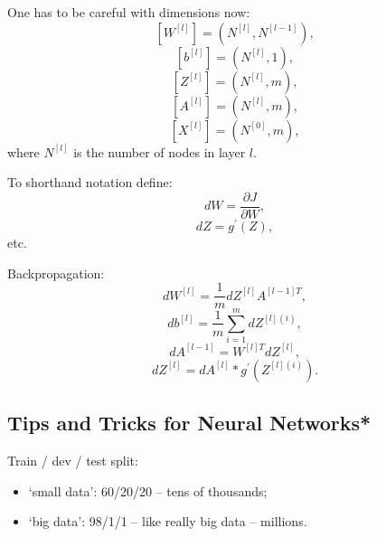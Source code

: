 \documentclass[a4paper,11pt]{article}
\begin{document}
One has to be careful with dimensions now:
\begin{equation}
\left[W^{[l]} \right] = \left(N^{[l]} , N^{[l-1]} \right) ,
\end{equation}
\begin{equation}
\left[b^{[l]} \right] = \left(N^{[l]} , 1\right) ,
\end{equation}
\begin{equation}
\left[Z^{[l]} \right] = \left(N^{[l]} , m \right) ,
\end{equation}
\begin{equation}
\left[A^{[l]} \right] = \left(N^{[l]} , m \right) ,
\end{equation}
\begin{equation}
\left[X^{[l]} \right] = \left(N^{[0]} , m \right) ,
\end{equation}
where \textcolor{OliveGreen}{$N^{[l]}$} is the number of nodes in layer \textcolor{OliveGreen}{$l$}.

To shorthand notation define:
\begin{equation}
dW = \frac{\partial J}{\partial W} ,
\end{equation}
\begin{equation}
dZ = g^\prime \left(Z \right) ,
\end{equation}
etc.

Backpropagation:
\begin{equation}
d W^{[l]} = \frac{1}{m} d Z^{[l]} A^{[l-1] T} ,
\end{equation}
\begin{equation}
db^{[l]} = \frac{1}{m} \sum_{i=1} ^m d Z^{[l] (i)} ,
\end{equation}
\begin{equation}
d A^{[l-1]} = W^{[l]T} dZ^{[l]} ,
\end{equation}
\begin{equation}
dZ^{[l]} = dA^{[l]} \ast g^\prime \left( Z^{[l] (i)} \right) .
\end{equation}
\subsection{Tips and Tricks for Neural Networks*}
Train / dev / test split:
\begin{itemize}
\item `small data': 60/20/20 -- tens of thousands;
\item `big data': 98/1/1 -- like really big data -- millions.
\end{itemize}
\end{document}
